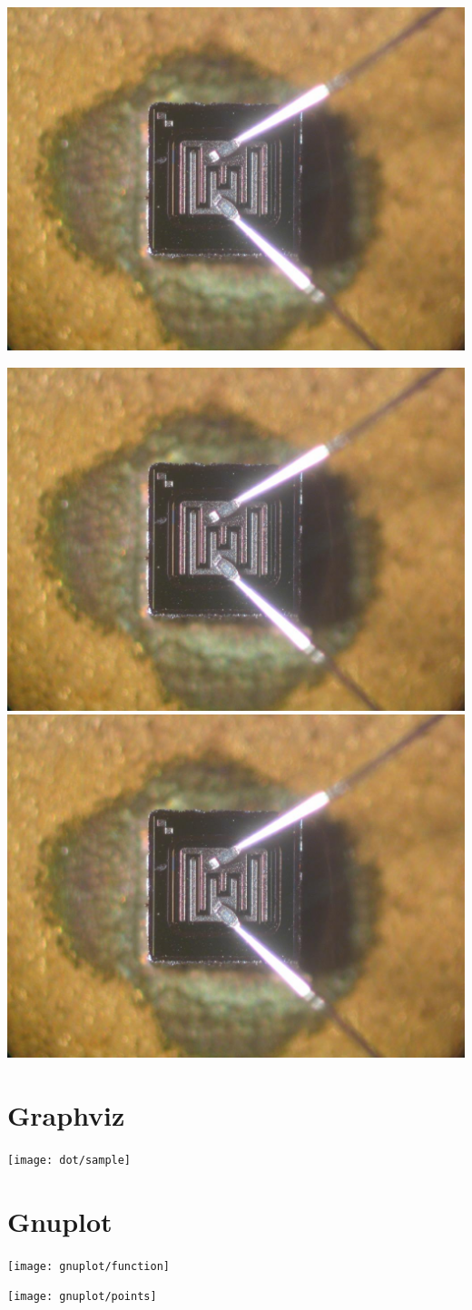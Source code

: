 {
\begin{center}
\includegraphics[scale=0.25]{pic/transistor}
\end{center}
}


{
\begin{center}
\includegraphics<1>[scale=0.125]{pic/transistor}
\pause
\includegraphics<2>[scale=0.25]{pic/transistor}
\end{center}
}


\section{Graphviz}


{
\begin{center}
\texttt{[image: dot/sample]}
\end{center}
}


\section{Gnuplot}


{
\begin{center}
\texttt{[image: gnuplot/function]}
\end{center}
}


{
\begin{center}
\texttt{[image: gnuplot/points]}
\end{center}
}
